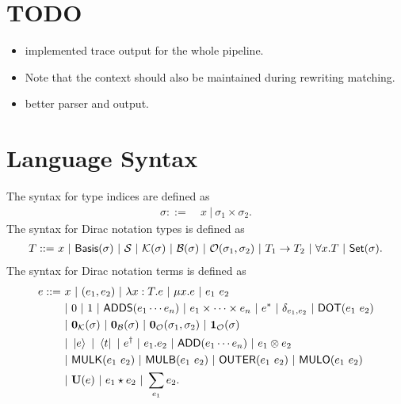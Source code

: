 \documentclass{article}
\begin{document}
\section{TODO}
\begin{itemize}
    \item implemented trace output for the whole pipeline.
    \item Note that the context should also be maintained during rewriting matching.
    \item better parser and output.
\end{itemize}


\section{Language Syntax}
\begin{definition}[syntax]
    The syntax for type indices are defined as
    \begin{align*}
        \sigma ::=\ & x\ |\ \sigma_1 \times \sigma_2.
    \end{align*}
    The syntax for Dirac notation types is defined as 
    \begin{align*}
        T ::=\ & x\ |\ \Basis(\sigma)\ |\ \SType\ |\ \KType(\sigma)\ |\ \BType(\sigma)\ |\ \OType(\sigma_1, \sigma_2)\ |\ T_1 \to T_2\ |\ \forall x.T\ |\ \SET(\sigma). \\
    \end{align*}
    The syntax for Dirac notation terms is defined as
    \begin{align*}
        e ::=\ & x\ |\ (e_1, e_2)\ |\ \lambda x : T.e\ |\ \mu x.e\ |\ e_1\ e_2 \\
        & |\ 0\ |\ 1\ |\ \ADDS(e_1 \cdots e_n) \ |\ e_1 \times \cdots \times e_n\ |\ e^* \ |\ \delta_{e_1, e_2}\ |\ \DOT(e_1\ e_2) \\
        & |\ \ZEROK(\sigma)\ |\ \ZEROB(\sigma)\ |\ \ZEROO(\sigma_1, \sigma_2)\ |\ \ONEO(\sigma) \\
        & |\ \ket{e}\ |\ \bra{t}\ |\ e^\dagger\ |\ e_1.e_2\ |\ \ADD(e_1 \cdots e_n)\ |\ e_1 \otimes e_2 \\
        & |\ \MULK(e_1\ e_2)\ |\ \MULB(e_1\ e_2)\ |\ \OUTER(e_1\ e_2)\ |\ \MULO(e_1\ e_2) \\
        & |\ \mathbf{U}(e)\ |\ e_1 \star e_2\ |\ \sum_{e_1} e_2.
    \end{align*}
\end{definition}
\end{document}
